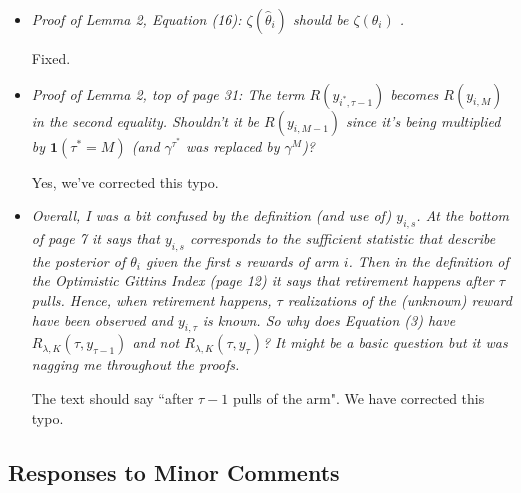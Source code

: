 \documentclass[11pt]{article}
\newcommand{\1}{\ensuremath{\mathbf{1}}} %
\theoremstyle{thm-sf}
\begin{document}
\begin{enumerate}
\begin{itemize}
			 \item {\it Proof of Lemma 2, Equation (16): $\zeta(\hat \theta_i)$ should be $\zeta(\theta_i)$ .}
			 
			 Fixed.
			 
			 \item {\it 
			 	Proof of Lemma 2, top of page 31: The term  $R(y_{i^*, \tau - 1})$ becomes $R(y_{i,M})$ in the second equality. Shouldn't it be $R(y_{i,M-1})$ since it's being multiplied by $\mathbf 1(\tau^* = M)$ (and $\gamma^{\tau^*}$ was replaced by $\gamma^M$)?
			 }
			 
			 Yes, we've corrected this typo.
		 
		 	\item {\it Overall, I was a bit confused by the definition (and use of) $y_{i,s}$. At the bottom of page 7 it says that $y_{i,s}$ corresponds to the sufficient statistic that describe the posterior of $\theta_i$ given the first $s$ rewards of arm $i$. Then in the definition of the Optimistic Gittins Index (page 12) it says that retirement happens after $\tau$ pulls. Hence, when retirement happens, $\tau$ realizations of the (unknown) reward have been observed and $y_{i,\tau}$ is known. 
		 		So why does Equation (3) have $R_{\lambda,K}(\tau, y_{\tau-1})$ and not $R_{\lambda,K}(\tau, y_{\tau})$? It might be a basic question but it was nagging me throughout the proofs.
	 		}
	 		
	 		The text should say ``after $\tau -1$ pulls of the arm". We have corrected this typo.
			 
			 
		\end{itemize}
	
	\end{enumerate}

	\subsection{Responses to Minor Comments}
	
\end{document}
